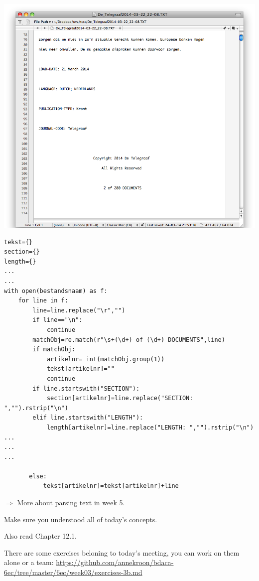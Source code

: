 \documentclass[compress]{beamer}
\begin{document}
{\begin{frame}[plain]
{			\includegraphics[width=\paperwidth,height=\paperheight,keepaspectratio]{../../pictures/lexisnexistxt2.png}
		}
	\end{frame}	
}
	
\begin{frame}
	\tiny
\begin{lstlisting}[basicstyle=\tiny]
tekst={}
section={}
length={}
...
...
with open(bestandsnaam) as f:
    for line in f:
        line=line.replace("\r","")
        if line=="\n":
            continue
        matchObj=re.match(r"\s+(\d+) of (\d+) DOCUMENTS",line)
        if matchObj:
            artikelnr= int(matchObj.group(1))
            tekst[artikelnr]=""
            continue
        if line.startswith("SECTION"):
            section[artikelnr]=line.replace("SECTION: ","").rstrip("\n")
        elif line.startswith("LENGTH"):
            length[artikelnr]=line.replace("LENGTH: ","").rstrip("\n")
...
...
...

       else:
           tekst[artikelnr]=tekst[artikelnr]+line
\end{lstlisting}
\normalsize

$\Rightarrow$ More about parsing text in week 5.

\end{frame}
	






\begin{frame}[standout]
	Make sure you understood all of today's concepts.
	
	Also read Chapter 12.1.

	There are some exercises beloning to today's meeting, you can work on them alone or a team:
	 \large{\url{https://github.com/annekroon/bdaca-6ec/tree/master/6ec/week03/exercises-3b.md}}
\end{frame}


\begin{frame}[plain]
    \printbibliography
\end{frame}
\end{document}
